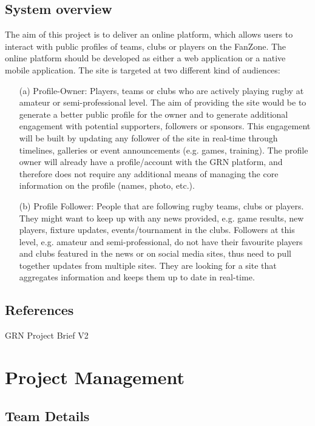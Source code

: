 \documentclass[10pt,a4paper]{article}
\begin{document}
\subsection{System overview}
The aim of this project is to deliver an online platform, which allows users to interact with public profiles of teams, clubs or players on the FanZone. The online platform should be developed as either a web application or a native mobile application. The site is targeted at two different kind of audiences:

\begin{itemize}
\item[(a)]
Profile-Owner: Players, teams or clubs who are actively playing rugby at amateur or semi-professional level. The aim of providing the site would be to generate a better public profile for the owner and to generate additional engagement with potential supporters, followers or sponsors. This engagement will be built by updating any follower of the site in real-time through timelines, galleries or event announcements (e.g. games, training). The profile owner will already have a profile/account with the GRN platform, and therefore does not require any additional means of managing the core information on the profile (names, photo, etc.). 
\item[(b)]
Profile Follower: People that are following rugby teams, clubs or players. They might want to keep up with any news provided, e.g. game results, new players, fixture updates, events/tournament in the clubs. Followers at this level, e.g. amateur and semi-professional, do not have their favourite players and clubs featured in the news or on social media sites, thus need to pull together updates from multiple sites. They are looking for a site that aggregates information and keeps them up to date in real-time. 
\end{itemize}

\subsection{References}
GRN Project Brief V2



\newpage
\section{Project Management}

\subsection{Team Details}
\end{document}

